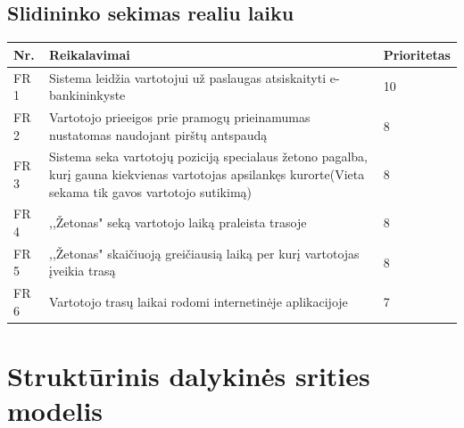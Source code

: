 \documentclass[oneside]{VUMIFPSkursinis}
\begin{document}
\subsection{Slidininko sekimas realiu laiku}

\begin{table}[htbp]

\begin{tabularx}{1\textwidth}{ |P{2.5cm}|X|P{3cm }| }  \hline
	Nr. & Reikalavimai & Prioritetas \\ \hline
	FR 1 & Sistema leidžia vartotojui už paslaugas atsiskaityti e-bankininkyste & 10 \\ \hline
	FR 2 & Vartotojo prieeigos prie pramogų prieinamumas nustatomas naudojant pirštų antspaudą & 8 \\ \hline
	
	
	
	FR 3& Sistema seka vartotojų poziciją specialaus žetono pagalba, kurį gauna kiekvienas vartotojas apsilankęs kurorte(Vieta sekama tik gavos vartotojo sutikimą) & 8  \\ \hline
	FR 4 & ,,Žetonas" seką vartotojo laiką praleista trasoje & 8 \\ \hline
	FR 5 & ,,Žetonas" skaičiuoją greičiausią laiką per kurį vartotojas įveikia trasą &  8 \\ \hline
	FR 6 & Vartotojo trasų laikai rodomi internetinėje aplikacijoje & 7 \\ \hline 
	

\end{tabularx}

	
\end{table}


\section{Struktūrinis dalykinės srities modelis}
\end{document}
